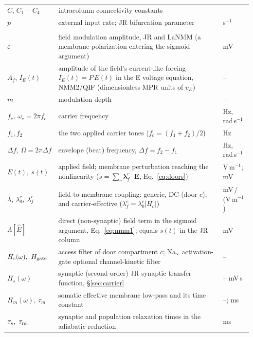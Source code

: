 \documentclass[11pt,a4paper]{article}
\providecommand{\DIFaddtex}[1]{{\protect\color{blue} \sf #1}} %
\providecommand{\DIFdeltex}[1]{{\protect\color{red} \scriptsize #1}} %
\providecommand{\DIFaddbegin}{} %
\providecommand{\DIFaddend}{} %
\providecommand{\DIFdelbegin}{} %
\providecommand{\DIFdelend}{} %
\providecommand{\DIFadd}[1]{\texorpdfstring{\DIFaddtex{#1}}{#1}} %
\providecommand{\DIFdel}[1]{\texorpdfstring{\DIFdeltex{#1}}{}} %
\begin{document}
{\begin{longtable}{@{}>{\raggedright\arraybackslash}p{} >{\raggedright\arraybackslash}p{} >{\raggedright\arraybackslash}p{}@{}}
$C,\,C_1\!-\!C_4$ & intracolumn connectivity constants & -- \\
$p$ & external input rate; JR bifurcation parameter & s$^{-1}$ \\
\midrule \multicolumn{3}{@{}l}{\textit{Applied TI field and coupling}} \\*
$\varepsilon$ & field modulation amplitude, JR and LaNMM (a membrane polarization entering the sigmoid argument) & mV \\
$A_f$, $I_E(t)$ & amplitude of the field's current-like forcing $I_E(t)=P\,E(t)$ in the E voltage equation, NMM2/QIF (dimensionless MPR units of $v_E$) & -- \\
$m$ & modulation depth & -- \\
$f_c,\ \omega_c\!=\!2\pi f_c$ & carrier frequency & Hz, rad\,s$^{-1}$ \\
$f_1,f_2$ & the two applied carrier tones ($f_c\!=\!(f_1\!+\!f_2)/2$) & Hz \\
$\Delta f,\ \Omega\!=\!2\pi\Delta f$ & envelope (beat) frequency, $\Delta f\!=\!f_2\!-\!f_1$ & Hz, rad\,s$^{-1}$ \\
$E(t),\ s(t)$ & applied field; membrane perturbation reaching the nonlinearity ($s\!=\!\sum_c\boldsymbol\lambda^c_f\!\cdot\!\mathbf E$, Eq.~\eqref{eq:doors}) & V\,m$^{-1}$; mV \\
$\lambda,\ \lambda^c_0,\ \lambda^c_f$ & field-to-membrane coupling: generic, DC (door $c$), and carrier-effective ($\lambda^c_f\!=\!\lambda^c_0|H_c|$) & mV\,/\,(V\,m$^{-1}$) \\
$\Lambda[\hat E]$ & direct (non-synaptic) field term in the sigmoid argument, Eq.~\eqref{eq:nmm1}; equals $s(t)$ in the JR column & mV \\
$H_c(\omega),\ H_{\rm gate}$ & access filter of \DIFdelbegin \DIFdel{door }\DIFdelend \DIFaddbegin \DIFadd{compartment }\DIFaddend $c$; \DIFdelbegin \DIFdel{Na$_{\rm v}$ activation-gate }\DIFdelend \DIFaddbegin \DIFadd{optional channel-kinetic }\DIFaddend filter & -- \\
$H_s(\omega)$ & \DIFdelbegin \DIFdel{synaptic (second-order) }\DIFdelend \DIFaddbegin \DIFadd{JR synaptic }\DIFaddend transfer function, \S\ref{sec:carrier} & \DIFdelbegin \DIFdel{-- }\DIFdelend \DIFaddbegin \DIFadd{mV\,s }\DIFaddend \\
$H_m(\omega),\ \tau_m$ & \DIFdelbegin \DIFdel{somatic }\DIFdelend \DIFaddbegin \DIFadd{effective }\DIFaddend membrane low-pass and its time constant & --; ms \\
\DIFaddbegin \DIFadd{$\tau_s,\ \tau_{\rm rel}$ }& \DIFadd{synaptic and population relaxation times in the adiabatic reduction }& \DIFadd{ms }\\

\end{longtable}}
\end{document}
